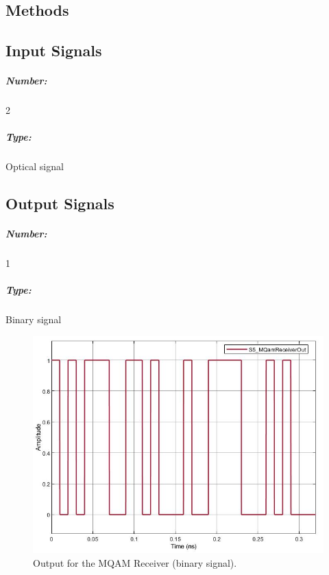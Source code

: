 \subsection*{Methods}

%

\subsection*{Input Signals}

\subparagraph*{Number:} 2

\subparagraph*{Type:} Optical signal

\subsection*{Output Signals}

\subparagraph*{Number:} 1

\subparagraph*{Type:} Binary signal

\begin{figure}[h]
\centering
\includegraphics[width=\textwidth]{./lib/m_qam_receiver/figures/receiver_time}
\caption{Output for the MQAM Receiver (binary signal).}
\end{figure}

